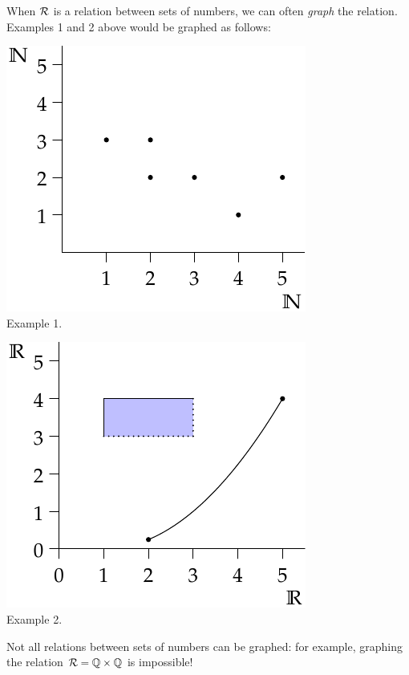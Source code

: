 When $\mathcal{R}$ is a relation between sets of numbers, we can often \emph{graph} the relation. Examples 1 and 2 above would be graphed as follows:
\begin{center}
	\begin{minipage}{0.3\textwidth}\centering
		\includegraphics[width=\textwidth]{relations-01-reln1}\\
		Example 1.
	\end{minipage}\qquad\qquad\qquad
	\begin{minipage}{0.3\textwidth}\centering
		\includegraphics[width=\textwidth]{relations-02-reln2}\\
		Example 2.
	\end{minipage}
\end{center}
Not all relations between sets of numbers can be graphed: for example, graphing the relation $\mathcal{R}=\mathbb{Q}\times\mathbb{Q}$ is impossible!\par


